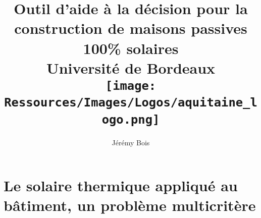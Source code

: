 \documentclass[11pt, oneside, fixOverflow]{JeremyThesis}
\title{
    {Outil d’aide à la décision pour la construction de maisons passives 100\% solaires}\\
    {\large Université de Bordeaux}\\
    {\texttt{[image: Ressources/Images/Logos/aquitaine\_logo.png]}}
}
\author{Jérémy Bois}
\date{}
\begin{document}



\begin{titlepage}
    \maketitle
    \thispagestyle{empty}
\end{titlepage}






% 
\footOn



% 

\chapter{Le solaire thermique appliqué au bâtiment, un problème multicritère}
% 
\end{document}
